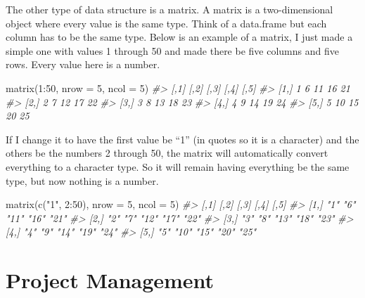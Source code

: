 \documentclass[
]{krantz}
\makeatletter
\newenvironment{Shaded}{\begin{snugshade}}{\end{snugshade}}
\newcommand{\AttributeTok}[1]{\textcolor[rgb]{0.61,0.61,0.61}{#1}}
\newcommand{\CommentTok}[1]{\textcolor[rgb]{0.37,0.37,0.37}{\textit{#1}}}
\newcommand{\DecValTok}[1]{\textcolor[rgb]{0.06,0.06,0.06}{#1}}
\newcommand{\FunctionTok}[1]{\textcolor[rgb]{0,0,0}{#1}}
\newcommand{\NormalTok}[1]{#1}
\newcommand{\SpecialCharTok}[1]{\textcolor[rgb]{0,0,0}{#1}}
\newcommand{\StringTok}[1]{\textcolor[rgb]{0.5,0.5,0.5}{#1}}
\newenvironment{kframe}{%
\medskip{}
\setlength{\fboxsep}{.8em}
 \def\at@end@of@kframe{}%
 \ifinner\ifhmode%
  \def\at@end@of@kframe{\end{minipage}}%
  \begin{minipage}{\columnwidth}%
 \fi\fi%
 \def\FrameCommand##1{\hskip\@totalleftmargin \hskip-\fboxsep
 \colorbox{shadecolor}{##1}\hskip-\fboxsep
     \hskip-\linewidth \hskip-\@totalleftmargin \hskip\columnwidth}%
 \MakeFramed {\advance\hsize-\width
   \@totalleftmargin\z@ \linewidth\hsize
   \@setminipage}}%
 {\par\unskip\endMakeFramed%
 \at@end@of@kframe}
\renewenvironment{Shaded}{\begin{kframe}}{\end{kframe}}
\makeatother
\begin{document}
The other type of data structure is a matrix. A matrix is a two-dimensional object where every value is the same type. Think of a data.frame but each column has to be the same type. Below is an example of a matrix, I just made a simple one with values 1 through 50 and made there be five columns and five rows. Every value here is a number.

\begin{Shaded}
\begin{Highlighting}[]
\FunctionTok{matrix}\NormalTok{(}\DecValTok{1}\SpecialCharTok{:}\DecValTok{50}\NormalTok{, }\AttributeTok{nrow =} \DecValTok{5}\NormalTok{, }\AttributeTok{ncol =} \DecValTok{5}\NormalTok{)}
\CommentTok{\#\textgreater{}      [,1] [,2] [,3] [,4] [,5]}
\CommentTok{\#\textgreater{} [1,]    1    6   11   16   21}
\CommentTok{\#\textgreater{} [2,]    2    7   12   17   22}
\CommentTok{\#\textgreater{} [3,]    3    8   13   18   23}
\CommentTok{\#\textgreater{} [4,]    4    9   14   19   24}
\CommentTok{\#\textgreater{} [5,]    5   10   15   20   25}
\end{Highlighting}
\end{Shaded}

If I change it to have the first value be ``1'' (in quotes so it is a character) and the others be the numbers 2 through 50, the matrix will automatically convert everything to a character type. So it will remain having everything be the same type, but now nothing is a number.

\begin{Shaded}
\begin{Highlighting}[]
\FunctionTok{matrix}\NormalTok{(}\FunctionTok{c}\NormalTok{(}\StringTok{"1"}\NormalTok{, }\DecValTok{2}\SpecialCharTok{:}\DecValTok{50}\NormalTok{), }\AttributeTok{nrow =} \DecValTok{5}\NormalTok{, }\AttributeTok{ncol =} \DecValTok{5}\NormalTok{)}
\CommentTok{\#\textgreater{}      [,1] [,2] [,3] [,4] [,5]}
\CommentTok{\#\textgreater{} [1,] "1"  "6"  "11" "16" "21"}
\CommentTok{\#\textgreater{} [2,] "2"  "7"  "12" "17" "22"}
\CommentTok{\#\textgreater{} [3,] "3"  "8"  "13" "18" "23"}
\CommentTok{\#\textgreater{} [4,] "4"  "9"  "14" "19" "24"}
\CommentTok{\#\textgreater{} [5,] "5"  "10" "15" "20" "25"}
\end{Highlighting}
\end{Shaded}

\hypertarget{part-project-management}{%
\part{Project Management}\label{part-project-management}}
\end{document}
